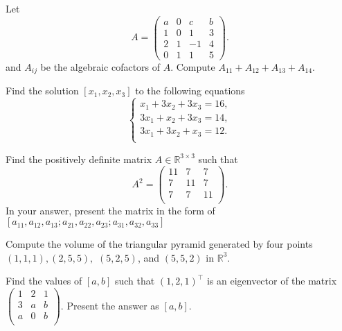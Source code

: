 \begin{problem} Let
\[
A = \begin{pmatrix}
a &0 & c &b\\
1 & 0 &1 & 3\\
2 & 1 & -1 & 4\\
0 & 1 & 1& 5
\end{pmatrix}.
\]
and $A_{ij}$ be the algebraic cofactors of $A$. Compute $A_{11}+A_{12}+A_{13}+A_{14}.$
\end{problem}

\begin{problem} Find the solution $[x_1,x_2,x_3]$ to the following equations
\[
\left\{\begin{array}{c}
  x_1+3x_2+3x_3=16, \\
  3x_1+x_2+3x_3=14, \\
  3x_1+3x_2+x_3=12. \\
\end{array}\right.
\]

\end{problem}

\begin{problem} Find the positively definite matrix $A\in \mathbb{R}^{3\times 3}$ such that
\[
A^2 = \begin{pmatrix}
11&7 & 7 \\
7 &11 &7\\
7 &7 & 11\\
\end{pmatrix}.
\]
In your answer, present the matrix in the form of $[a_{11},a_{12},a_{13}; a_{21},a_{22},a_{23}; a_{31},a_{32},a_{33} ]$
\end{problem}

\begin{problem} Compute the volume of the triangular pyramid
 generated by four points $(1,1,1),(2,5,5), $  $(5,2,5) $, and $(5,5,2)$ in $\mathbb{R}^3.$
\end{problem}

\begin{problem}  Find the values of $[a,b]$ such that $(1,2,1)^{\top}$ is an eigenvector of the matrix
 $\left(
    \begin{array}{ccc}
      1 & 2 &1\\
      3 & a & b \\
      a & 0 & b \\
    \end{array}
  \right)
 $. Present the answer as $[a,b]$. 

\end{problem}

